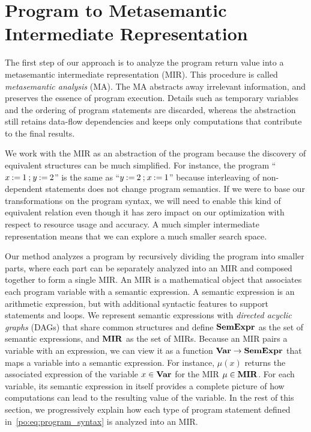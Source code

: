 \section{Program to Metasemantic Intermediate Representation}
\label{po:sec:program_to_mir}

The first step of our approach is to analyze the program return value
into a metasemantic intermediate representation (MIR).  This procedure is
called \emph{metasemantic analysis} (MA).  The MA abstracts away irrelevant
information, and preserves the essence of program execution.  Details such
as temporary variables and the ordering of program statements are discarded,
whereas the abstraction still retains data-flow dependencies and keeps only
computations that contribute to the final results.

We work with the MIR as an abstraction of the program because the discovery of
equivalent structures can be much simplified.  For instance, the program ``$x
\mathbin{:=} 1 \mathbin{;} y \mathbin{:=} 2$'' is the same as ``$y \mathbin{:=} 2 \mathbin{;} x
\mathbin{:=} 1$'' because interleaving of non-dependent statements does not change
program semantics.  If we were to base our transformations on the program
syntax, we will need to enable this kind of equivalent relation even though
it has zero impact on our optimization with respect to resource usage and
accuracy.  A much simpler intermediate representation means that we can explore
a much smaller search space.

Our method analyzes a program by recursively dividing the program into
smaller parts, where each part can be separately analyzed into an MIR and
composed together to form a single MIR\@.  An MIR is a mathematical object
that associates each program variable with a semantic expression.  A semantic
expression is an arithmetic expression, but with additional syntactic features
to support \iflit{} statements and \whilelit{} loops.  We represent semantic
expressions with \emph{directed acyclic graphs} (DAGs) that share common
structures and define $\mathbf{SemExpr}$ as the set of semantic expressions, and
$\mathbf{MIR}$ as the set of MIRs.  Because an MIR pairs a variable with an
expression, we can view it as a function $\mathbf{Var} \to \mathbf{SemExpr}$ that maps
a variable into a semantic expression.  For instance, $\mu(x)$ returns the
associated expression of the variable $x \in \mathbf{Var}$ for the MIR $\mu \in
\mathbf{MIR}$.  For each variable, its semantic expression in itself provides a
complete picture of how computations can lead to the resulting value of the
variable.  In the rest of this section, we progressively explain how each type
of program statement defined in~\eqref{po:eq:program_syntax} is analyzed into
an MIR\@.

